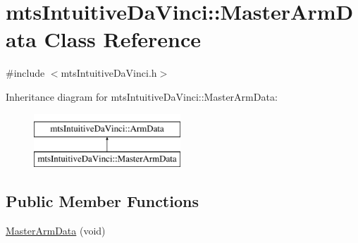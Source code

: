 \hypertarget{classmts_intuitive_da_vinci_1_1_master_arm_data}{\section{mts\-Intuitive\-Da\-Vinci\-:\-:Master\-Arm\-Data Class Reference}
\label{classmts_intuitive_da_vinci_1_1_master_arm_data}
}


{\ttfamily \#include $<$mts\-Intuitive\-Da\-Vinci.\-h$>$}

Inheritance diagram for mts\-Intuitive\-Da\-Vinci\-:\-:Master\-Arm\-Data\-:\begin{figure}[H]
\begin{center}
\leavevmode
\includegraphics[height=2.000000cm]{d7/d75/classmts_intuitive_da_vinci_1_1_master_arm_data}
\end{center}
\end{figure}
\subsection*{Public Member Functions}
\begin{DoxyCompactItemize}
\item 
\hyperlink{classmts_intuitive_da_vinci_1_1_master_arm_data_a5dbd5ea0c9462f8ce324c9b5a0f8521c}{Master\-Arm\-Data} (void)
\end{DoxyCompactItemize}
